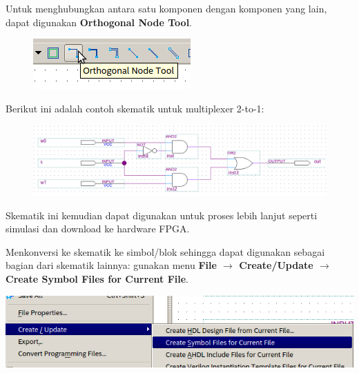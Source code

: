 Untuk menghubungkan antara satu komponen dengan komponen yang lain, dapat
digunakan \textbf{Orthogonal Node Tool}.
\begin{figure}[H]
\centering
\includegraphics[scale=0.5]{images/OrthogonalNodeTool.png}
\par
\end{figure}

Berikut ini adalah contoh skematik untuk multiplexer 2-to-1:
\begin{figure}[H]
\centering
\includegraphics[width=\textwidth]{images/sch_mux_2_1.png}
\par
\end{figure}

Skematik ini kemudian dapat digunakan untuk proses lebih lanjut seperti
simulasi dan download ke hardware FPGA.

Menkonversi ke skematik ke simbol/blok sehingga dapat digunakan sebagai
bagian dari skematik lainnya: gunakan menu \textbf{File $\rightarrow$
Create/Update $\rightarrow$ Create Symbol Files for Current File}.

{\centering
\includegraphics[scale=0.5]{images/MenuCreateSymbol.png}
\par}


